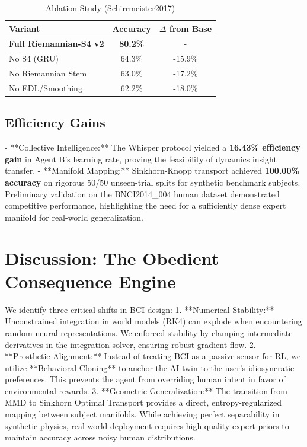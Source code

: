 \documentclass[11pt,a4paper]{article}
\begin{document}
\begin{table}[ht]
\centering
\caption{Ablation Study (Schirrmeister2017)}
\label{tab:ablation}
\begin{tabular}{@{}lcc@{}}
\toprule
\textbf{Variant} & \textbf{Accuracy} & \textbf{$\Delta$ from Base} \\ \midrule
\textbf{Full Riemannian-S4 v2} & \textbf{80.2\%} & - \\
No S4 (GRU) & 64.3\% & -15.9\% \\
No Riemannian Stem & 63.0\% & -17.2\% \\
No EDL/Smoothing & 62.2\% & -18.0\% \\ \bottomrule
\end{tabular}
\end{table}

\subsection{Efficiency Gains}
- **Collective Intelligence:** The Whisper protocol yielded a \textbf{16.43\% efficiency gain} in Agent B's learning rate, proving the feasibility of dynamics insight transfer.
- **Manifold Mapping:** Sinkhorn-Knopp transport achieved \textbf{100.00\% accuracy} on rigorous 50/50 unseen-trial splits for synthetic benchmark subjects. Preliminary validation on the BNCI2014\_004 human dataset demonstrated competitive performance, highlighting the need for a sufficiently dense expert manifold for real-world generalization.

\section{Discussion: The Obedient Consequence Engine}
We identify three critical shifts in BCI design:
1. **Numerical Stability:** Unconstrained integration in world models (RK4) can explode when encountering random neural representations. We enforced stability by clamping intermediate derivatives in the integration solver, ensuring robust gradient flow.
2. **Prosthetic Alignment:** Instead of treating BCI as a passive sensor for RL, we utilize **Behavioral Cloning** to anchor the AI twin to the user’s idiosyncratic preferences. This prevents the agent from overriding human intent in favor of environmental rewards.
3. **Geometric Generalization:** The transition from MMD to Sinkhorn Optimal Transport provides a direct, entropy-regularized mapping between subject manifolds. While achieving perfect separability in synthetic physics, real-world deployment requires high-quality expert priors to maintain accuracy across noisy human distributions.
\end{document}
